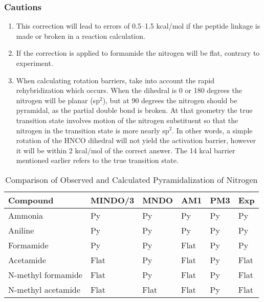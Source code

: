 \subsubsection{Cautions}\label{mmok}
\begin{enumerate}
\item This correction will lead to errors of 0.5--1.5  kcal/mol  if
the   peptide   linkage   is  made  or  broken  in  a  reaction
calculation.
\item If the correction is applied to formamide the nitrogen will  be
            flat, contrary to experiment.
\item When calculating rotation barriers, take into account the rapid
            rehybridization  which  occurs.   When the dihedral is 0 or 180
            degrees the nitrogen will be planar (sp$^2$), but  at  90  degrees
            the nitrogen should be pyramidal, as the partial double bond is
            broken.  At that geometry the true  transition  state  involves
            motion  of the nitrogen substituent so that the nitrogen in the
            transition state is more nearly sp$^2$.  In other words, a  simple
            rotation  of  the  HNCO  dihedral will not yield the activation
            barrier, however it will be within 2 kcal/mol of  the  correct
            answer.   The  14  kcal barrier mentioned earlier refers to the
            true transition state.
\end{enumerate}     
\begin{table}
\caption{\label{py}Comparison of Observed and Calculated Pyramidalization of 
Nitrogen}
\begin{center}
\begin{tabular}{llllll} \hline
        Compound    & MINDO/3  & MNDO  & AM1   &PM3  &  Exp  \\ \hline
  Ammonia           & Py       &  Py   & Py    &Py   &  Py  \\
  Aniline           & Py       &  Py   & Py    &Py   &  Py  \\
  Formamide         & Py       &  Py   & Flat  &Py   &  Py  \\
  Acetamide         & Flat     &  Py   & Flat  &Py   &  Flat  \\
  N-methyl formamide& Flat     &  Py   & Flat  &Py   &  Flat  \\
  N-methyl acetamide& Flat     &  Flat & Flat  &Py   &  Flat \\ \hline 
\end{tabular}
\end{center}
\end{table}

